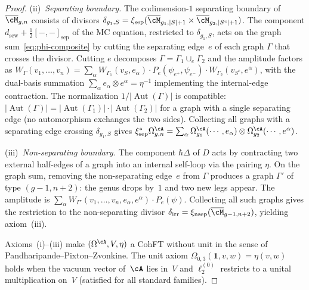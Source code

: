 \begin{proof}
\smallskip\noindent
(ii)~\emph{Separating boundary.}
The codimension-$1$ separating boundary of $\overline{\cM}_{g,n}$
consists of divisors
$\delta_{g_1,S} = \xi_{\mathrm{sep}}(\overline{\cM}_{g_1,|S|+1}
\times \overline{\cM}_{g_2,|S^c|+1})$.
The component $d_{\mathrm{sew}} + \tfrac{1}{2}[-,-]_{\mathrm{sep}}$
of the MC equation, restricted to $\delta_{g_1,S}$,
acts on the graph sum~\eqref{eq:phi-composite} by cutting the
separating edge~$e$ of each graph $\Gamma$ that crosses the
divisor.  Cutting $e$ decomposes $\Gamma = \Gamma_1 \cup_e \Gamma_2$
and the amplitude factors as
$W_\Gamma(v_1, \ldots, v_n)
= \sum_\alpha
W_{\Gamma_1}(v_S, e_\alpha)
\cdot P_e(\psi_{e^+}, \psi_{e^-})
\cdot W_{\Gamma_2}(v_{S^c}, e^\alpha)$,
with the dual-basis summation
$\sum_\alpha e_\alpha \otimes e^\alpha = \eta^{-1}$
implementing the internal-edge contraction.  The
normalization $1/|\operatorname{Aut}(\Gamma)|$ is compatible:
$|\operatorname{Aut}(\Gamma)| =
|\operatorname{Aut}(\Gamma_1)| \cdot
|\operatorname{Aut}(\Gamma_2)|$ for a graph with a single
separating edge (no automorphism exchanges the two sides).
Collecting all graphs with a separating edge crossing
$\delta_{g_1,S}$ gives
$\xi_{\mathrm{sep}}^* \Omega_{g,n}^{\cA}
= \sum_\alpha \Omega_{g_1}^{\cA}(\cdots, e_\alpha)
\otimes \Omega_{g_2}^{\cA}(\cdots, e^\alpha)$.

\smallskip\noindent
(iii)~\emph{Non-separating boundary.}
The component $\hbar\Delta$ of $D$ acts by contracting two
external half-edges of a graph into an internal self-loop via the
pairing $\eta$.  On the graph sum, removing the non-separating
edge~$e$ from $\Gamma$ produces a graph $\Gamma'$ of type
$(g{-}1, n{+}2)$: the genus drops by~$1$ and two new legs appear.
The amplitude is
$\sum_\alpha W_{\Gamma'}(v_1, \ldots, v_n, e_\alpha, e^\alpha)
\cdot P_e(\psi)$.
Collecting all such graphs gives the restriction to the
non-separating divisor
$\delta_{\mathrm{irr}} =
\xi_{\mathrm{nsep}}(\overline{\cM}_{g-1,n+2})$,
yielding axiom~(iii).

Axioms~(i)--(iii) make $(\Omega^\cA, V, \eta)$ a CohFT
without unit in the sense of
Pandharipande--Pixton--Zvonkine.  The unit axiom
$\Omega_{0,3}(\mathbf{1}, v, w) = \eta(v,w)$ holds when the
vacuum vector of~$\cA$ lies in~$V$ and $\ell_2^{(0)}$
restricts to a unital multiplication on~$V$ (satisfied for
all standard families).
\end{proof}

